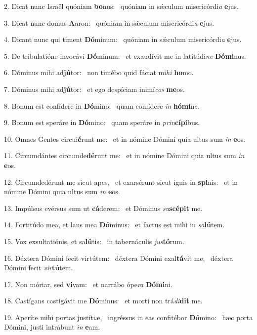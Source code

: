 2. Dicat nunc Israël quóniam \textbf{bo}nus: \ast\  quóniam in sǽculum misericórdi\textit{a} \textbf{e}jus.\

3. Dicat nunc domus \textbf{A}aron: \ast\  quóniam in sǽculum misericórdi\textit{a} \textbf{e}jus.\

4. Dicant nunc qui timent \textbf{Dó}minum: \ast\  quóniam in sǽculum misericórdi\textit{a} \textbf{e}jus.\

5. De tribulatióne invocávi \textbf{Dó}minum: \ast\  et exaudívit me in latitúdi\textit{ne} \textbf{Dó}\textbf{mi}nus.\

6. Dóminus mihi ad\textbf{jú}tor: \ast\  non timébo quid fáciat mi\textit{hi} \textbf{ho}mo.\

7. Dóminus mihi ad\textbf{jú}tor: \ast\  et ego despíciam inimí\textit{cos} \textbf{me}os.\

8. Bonum est confídere in \textbf{Dó}mino: \ast\  quam confídere \textit{in} \textbf{hó}\textbf{mi}ne.\

9. Bonum est speráre in \textbf{Dó}mino: \ast\  quam speráre in \textit{prin}\textbf{cí}\textbf{pi}bus.\

10. Omnes Gentes circui\textbf{é}runt me: \ast\  et in nómine Dómini quia ultus sum \textit{in} \textbf{e}os.\

11. Circumdántes circumde\textbf{dé}runt me: \ast\  et in nómine Dómini quia ultus sum \textit{in} \textbf{e}os.\

12. Circumdedérunt me sicut apes, \dag\  et exarsérunt sicut ignis in \textbf{spi}nis: \ast\  et in nómine Dómini quia ultus sum \textit{in} \textbf{e}os.\

13. Impúlsus evérsus sum ut \textbf{cá}derem: \ast\  et Dóminus \textit{su}\textbf{scé}\textbf{pit} me.\

14. Fortitúdo mea, et laus mea \textbf{Dó}minus: \ast\  et factus est mihi in \textit{sa}\textbf{lú}tem.\

15. Vox exsultatiónis, et sa\textbf{lú}tis: \ast\  in tabernáculis \textit{jus}\textbf{tó}rum.\

16. Déxtera Dómini fecit virtútem: \dag\  déxtera Dómini exal\textbf{tá}vit me, \ast\  déxtera Dómini fecit \textit{vir}\textbf{tú}tem.\

17. Non móriar, sed \textbf{vi}vam: \ast\  et narrábo ópe\textit{ra} \textbf{Dó}\textbf{mi}ni.\

18. Castígans castigávit me \textbf{Dó}minus: \ast\  et morti non trá\textit{di}\textbf{dit} me.\

19. Aperíte mihi portas justítiæ, \dag\  ingréssus in eas confitébor \textbf{Dó}mino: \ast\  hæc porta Dómini, justi intrábunt \textit{in} \textbf{e}am.\


